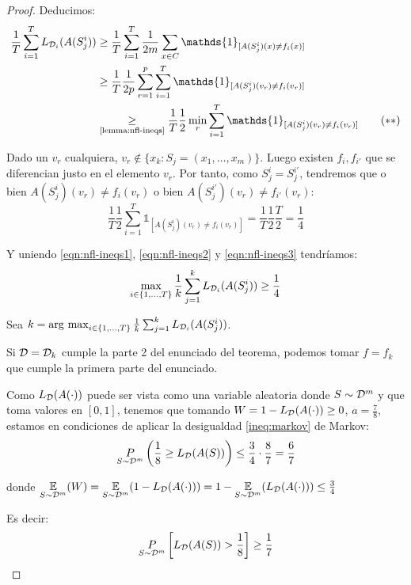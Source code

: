 \begin{proof}
Deducimos:
\begin{align}
\frac{1}{T} \sum_{i=1}^{T}  L_{\dist_i} (A(S_j^i)) &\ge
\frac{1}{T} \sum_{i=1}^{T}  \frac{1}{2m} \sum_{x \in C} \mathds{1}_{[A(S^i_j)(x) \neq f_i(x)]}\nonumber\\
&\ge \frac{1}{T} \frac{1}{2p} \sum_{r=1}^p \sum_{i=1}^{T}  \mathds{1}_{[A(S^i_j)(v_r) \neq f_i(v_r)]} \nonumber\\
&\underset{\textrm{\ref{lemma:nfl-ineqs}}}{\ge} \frac{1}{T} \frac{1}{2} \min_{r} \sum_{i=1}^{T}  \mathds{1}_{[A(S^i_j)(v_r) \neq f_i(v_r)]} 
\label{eqn:nfl-ineqs2}\tag{$\ast\ast$}
\end{align}


Dado un $v_r$ cualquiera, $v_r \notin \bigg\{x_k: S_j = (x_1, \ldots, x_m)\bigg\}$. Luego existen 
$f_i, f_{i'}$ que se diferencian justo en el elemento $v_r$. Por tanto, como $S_j^i = S_j^{i'}$,
tendremos que o bien $A(S^i_j)(v_r) \neq f_i(v_r)$ o bien $A(S^{i'}_j)(v_r) \neq f_{i'}(v_r)$:
\begin{equation}
\frac{1}{T} \frac{1}{2} \sum_{i=1}^{T}  \mathds{1}_{[A(S^i_j)(v_r) \neq f_i(v_r)]} = 
  \frac{1}{T} \frac{1}{2} \frac{T}{2} = \frac{1}{4}
\label{eqn:nfl-ineqs3}\tag{$\ast\ast\ast$}
\end{equation}

Y uniendo \eqref{eqn:nfl-ineqs1}, \eqref{eqn:nfl-ineqs2} y \eqref{eqn:nfl-ineqs3} tendríamos:
\[
  \max_{i \in \{1,\ldots, T\}} \frac{1}{k} \sum_{j=1}^{k} L_{\mathcal{D}_i} (A(S_j^i)) \ge \frac{1}{4}
\]

Sea $k = \operatorname*{arg\,\max}_{i \in \{1,\ldots, T\}} \frac{1}{k} \sum_{j=1}^{k} L_{\mathcal{D}_i} (A(S_j^i))$.

Si $\mathcal{D} = \mathcal{D}_k$ cumple la parte 2 del enunciado del teorema, podemos tomar $f=f_k$ que cumple la primera
parte del enunciado.

Como $L_{\mathcal{D}} (A(\cdot))$ puede ser vista como una variable aleatoria donde $S \sim \mathcal{D}^m$ y que toma
valores en $[0,1]$, tenemos que tomando $W = 1-L_{\mathcal{D}}(A(\cdot))\ge 0$, $a=\frac{7}{8}$, estamos en 
condiciones de aplicar la desigualdad \ref{ineq:markov} de Markov:
\[
  \underset{S\sim \mathcal{D}^m}{P} \left(\frac{1}{8} \ge L_{\mathcal{D}}(A(S)) \right) \le \frac{3}{4} \cdot \frac{8}{7} = \frac{6}{7}
\]

donde $\underset{S\sim \mathcal{D}^m}{\mathbb{E}}(W) = \underset{S\sim \mathcal{D}^m}{\mathbb{E}} (1 - L_{\mathcal{D}}(A(\cdot))) = 1 - \underset{S\sim \mathcal{D}^m}{\mathbb{E}} (L_{\mathcal{D}}(A(\cdot))) \le \frac{3}{4}$

Es decir:
\[
  \underset{S\sim \mathcal{D}^m}{P} \left[ L_{\mathcal{D}}(A(S)) > \frac{1}{8} \right] \ge \frac{1}{7}
\]
\end{proof}

